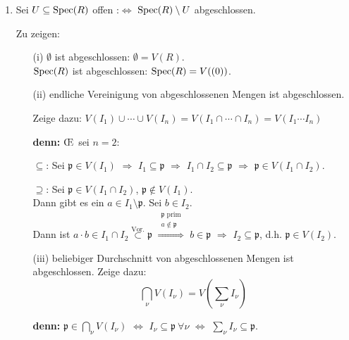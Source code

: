 \documentclass[a4paper, 10pt]{report}
\begin{document}
\begin{Bew}
\begin{enumerate}
\item Sei $U \subseteq \mathrm{Spec}(R)$ offen :$\Leftrightarrow$ $\mathrm{Spec}(R) \setminus U$
abgeschlossen.

Zu zeigen:
\begin{enumerate}
\item[(i)] $\emptyset$ ist abgeschlossen: $\emptyset = V(R)$.\\
$\mathrm{Spec}(R)$ ist abgeschlossen: $\mathrm{Spec}(R) = V( (0) )$.

\item[(ii)] endliche Vereinigung von abgeschlossenen Mengen ist abgeschlossen.

Zeige dazu: $V(I_1) \cup \cdots \cup V(I_n) = V(I_1 \cap \cdots \cap I_n) = V(I_1 \cdots I_n)$

\textbf{denn:} \OE\ sei $n=2$:

\glqq$\subseteq$\grqq: Sei $\mathfrak{p} \in V(I_1)$ $\Rightarrow$ $I_1 \subseteq \mathfrak{p}$ $\Rightarrow$ $I_1 \cap I_2 \subseteq \mathfrak{p}$ $\Rightarrow$ $\mathfrak{p} \in V(I_1 \cap I_2)$.

\glqq$\supseteq$\grqq: Sei $\mathfrak{p} \in V(I_1 \cap I_2)$, $\mathfrak{p} \not\in V(I_1)$.\\
Dann gibt es ein $a \in I_1 \setminus \mathfrak{p}$. Sei $b \in I_2$.\\
Dann ist $a \cdot b \in I_1 \cap I_2 \overset{\text{Vor.}}{\subset} \mathfrak{p}$ $\overset{\substack{\mathfrak{p}\text{ prim} \\ a \notin \mathfrak{p}}}{\Rightarrow}$ $b \in \mathfrak{p}$ $\Rightarrow$ $I_2 \subseteq \mathfrak{p}$, d.h. $\mathfrak{p} \in V(I_2)$.

\item[(iii)] beliebiger Durchschnitt von abgeschlossenen Mengen ist abgeschlossen. Zeige dazu:
$$\bigcap_\nu V(I_\nu) = V\left(\sum_\nu I_\nu\right)$$

\textbf{denn:} $\mathfrak{p} \in \bigcap_\nu V(I_\nu)$ $\Leftrightarrow$ $I_\nu \subseteq \mathfrak{p}\ \forall \nu$ $\Leftrightarrow$ $\sum_\nu I_\nu \subseteq \mathfrak{p}$.

\end{enumerate}
\end{enumerate} 

\end{Bew}
\end{document}
